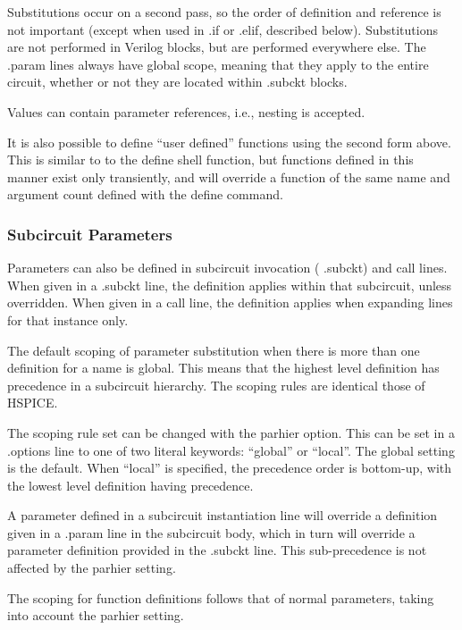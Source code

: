 Substitutions occur on a second pass, so the order of definition and
reference is not important (except when used in {\vt .if} or {\vt
.elif}, described below).  Substitutions are not performed in Verilog
blocks, but are performed everywhere else.  The {\vt .param} lines
always have global scope, meaning that they apply to the entire
circuit, whether or not they are located within {\vt .subckt} blocks.

Values can contain parameter references, i.e., nesting is accepted. 
       
It is also possible to define ``user defined'' functions using the
second form above.  This is similar to to the {\cb define} shell
function, but functions defined in this manner exist only transiently,
and will override a function of the same name and argument count
defined with the {\cb define} command. 

\subsubsection{Subcircuit Parameters}
 
Parameters can also be defined in subcircuit invocation ({\vt
.subckt}) and call lines.  When given in a {\vt .subckt} line, the
definition applies within that subcircuit, unless overridden.  When
given in a call line, the definition applies when expanding lines for
that instance only.

The default scoping of parameter substitution when there is more than
one definition for a name is global.  This means that the highest
level definition has precedence in a subcircuit hierarchy.  The
scoping rules are identical those of HSPICE.

The scoping rule set can be changed with the {\vt parhier} option. 
This can be set in a {\vt .options} line to one of two literal
keywords:  ``{\vt global}'' or ``{\vt local}''.  The global setting is
the default.  When ``{\vt local}'' is specified, the precedence order
is bottom-up, with the lowest level definition having precedence.

A parameter defined in a subcircuit instantiation line will override a
definition given in a {\vt .param} line in the subcircuit body, which
in turn will override a parameter definition provided in the {\vt
.subckt} line.  This sub-precedence is not affected by the {\vt
parhier} setting.

The scoping for function definitions follows that of normal
parameters, taking into account the {\vt parhier} setting. 
 
